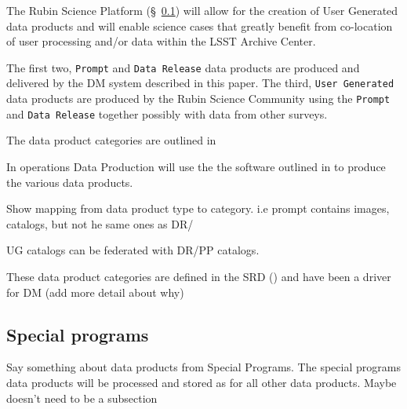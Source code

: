 The Rubin Science Platform (\S~\ref{}) will allow for the creation of User Generated data
products and will enable science cases that greatly benefit from co-location of
user processing and/or data within the LSST Archive Center. 

%



The first two, {\tt Prompt} and {\tt Data Release} data products are produced and delivered by the DM system described in this paper. 
The third, {\tt User Generated} data products are produced by the Rubin Science Community using the {\tt Prompt} and {\tt Data Release} together possibly with data from other surveys. 

The data product categories are outlined in \cite{LPM-231}

In operations Data Production will use the the software outlined in  to produce the various data products.

Show mapping from data product type to category. i.e prompt contains images, catalogs, but not he same ones as DR/ 

UG catalogs can be federated with DR/PP catalogs. 

These data product categories are defined in the SRD (\citep{LPM-17}) and have been a driver for DM 
(add more detail about why) 

\subsection{Special programs}
Say something about data products from Special Programs.  
The special programs data products will be processed and stored as for all other data products. 
Maybe doesn't need to be a subsection

